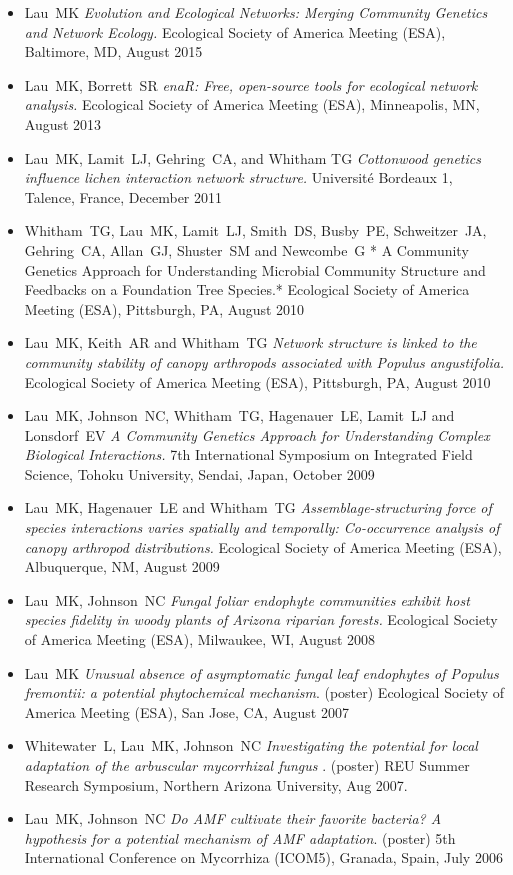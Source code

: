 \documentclass[a4paper]{article}
\begin{document}
\begin{itemize}
{  Photosynthesis and decomposition in a model micro-ecosystem.},
  Ecological Society of America Meeting (ESA), Baltimore, MD, August
  2015
\item Lau~MK \emph{Evolution and Ecological Networks: Merging
  Community Genetics and Network Ecology.} Ecological Society of
  America Meeting (ESA), Baltimore, MD, August 2015
\item
  Lau~MK, Borrett~SR \emph{enaR: Free, open-source tools for ecological
  network analysis.} Ecological Society of America Meeting (ESA),
  Minneapolis, MN, August 2013
\item
  Lau~MK, Lamit~LJ, Gehring~CA, and Whitham TG \emph{Cottonwood genetics
  influence lichen interaction network structure.} Université Bordeaux
  1, Talence, France, December 2011
\item
  Whitham~TG, Lau~MK, Lamit~LJ, Smith~DS, Busby~PE, Schweitzer~JA,
  Gehring~CA, Allan~GJ, Shuster~SM and Newcombe~G * A Community Genetics
  Approach for Understanding Microbial Community Structure and Feedbacks
  on a Foundation Tree Species.* Ecological Society of America Meeting
  (ESA), Pittsburgh, PA, August 2010
\item
  Lau~MK, Keith~AR and Whitham~TG \emph{Network structure is linked to
  the community stability of canopy arthropods associated with Populus
  angustifolia.} Ecological Society of America Meeting (ESA),
  Pittsburgh, PA, August 2010
\item
  Lau~MK, Johnson~NC, Whitham~TG, Hagenauer~LE, Lamit~LJ and Lonsdorf~EV
  \emph{A Community Genetics Approach for Understanding Complex
  Biological Interactions.} 7th International Symposium on Integrated
  Field Science, Tohoku University, Sendai, Japan, October 2009
\item
  Lau~MK, Hagenauer~LE and Whitham~TG \emph{Assemblage-structuring force
  of species interactions varies spatially and temporally: Co-occurrence
  analysis of canopy arthropod distributions.} Ecological Society of
  America Meeting (ESA), Albuquerque, NM, August 2009
\item
  Lau~MK, Johnson~NC \emph{Fungal foliar endophyte communities exhibit
  host species fidelity in woody plants of Arizona riparian forests.}
  Ecological Society of America Meeting (ESA), Milwaukee, WI, August
  2008
\item
  Lau~MK \emph{Unusual absence of asymptomatic fungal leaf endophytes of
  Populus fremontii: a potential phytochemical mechanism}. (poster)
  Ecological Society of America Meeting (ESA), San Jose, CA, August 2007
\item
  Whitewater~L, Lau~MK, Johnson~NC \emph{Investigating the potential for
  local adaptation of the arbuscular mycorrhizal fungus} . (poster) REU
  Summer Research Symposium, Northern Arizona University, Aug 2007.
\item
  Lau~MK, Johnson~NC \emph{Do AMF cultivate their favorite bacteria? A
  hypothesis for a potential mechanism of AMF adaptation}. (poster) 5th
  International Conference on Mycorrhiza (ICOM5), Granada, Spain, July
  2006

\end{itemize}
\end{document}
